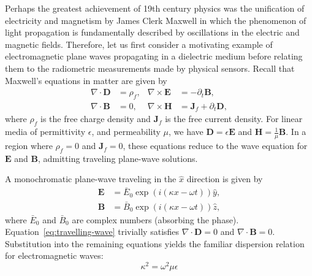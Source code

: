 Perhaps the greatest achievement of 19th century physics was the unification of
electricity and magnetism by James Clerk Maxwell in which the phenomenon of
light propagation is fundamentally described by oscillations in the electric and
magnetic fields. Therefore, let us first consider a motivating example of
electromagnetic plane waves propagating in a dielectric medium before relating them to
the radiometric measurements made by physical sensors. Recall that Maxwell's
equations in matter are given by
\begin{equation}\label{eq:maxwell}
  \begin{aligned}
    \nabla \cdot \mathbf{D} &= \rho_f, & \nabla \times \mathbf{E} &= - \partial_t \mathbf{B}, \\
    \nabla \cdot \mathbf{B} &= 0, & \nabla \times \mathbf{H} &= \mathbf{J}_f + \partial_t\mathbf{D},
  \end{aligned}
\end{equation}
where $\rho_f$ is the free charge density and $\mathbf{J}_f$ is the free current
density. For linear media of permittivity $\epsilon$, and permeability $\mu$, we
have $\mathbf{D}=\epsilon\mathbf{E}$ and $\mathbf{H}=\frac{1}{\mu}\mathbf{B}$.
In a region where $\rho_f=0$ and $\mathbf{J}_f=0$, these equations reduce to the
wave equation for $\mathbf{E}$ and $\mathbf{B}$, admitting traveling plane-wave
solutions.

A monochromatic plane-wave traveling in the $\hat{x}$ direction is given by
\begin{equation}\label{eq:travelling-wave}
  \begin{aligned}
    \mathbf{E} &= \bar{E}_0\exp(i(\kappa x - \omega t))\hat{y}, \\
    \mathbf{B} &= \bar{B}_0\exp(i(\kappa x - \omega t))\hat{z},
  \end{aligned}
\end{equation}
where $\bar{E}_0$ and $\bar{B}_0$ are complex numbers
(absorbing the phase). Equation~\ref{eq:travelling-wave} trivially satisfies
$\nabla \cdot \mathbf{D} = 0$ and $\nabla \cdot \mathbf{B} = 0$. Substitution into
the remaining equations yields the familiar dispersion relation for
electromagnetic waves:
\begin{equation}
  \kappa^2 = \omega^2\mu\epsilon
\end{equation}

